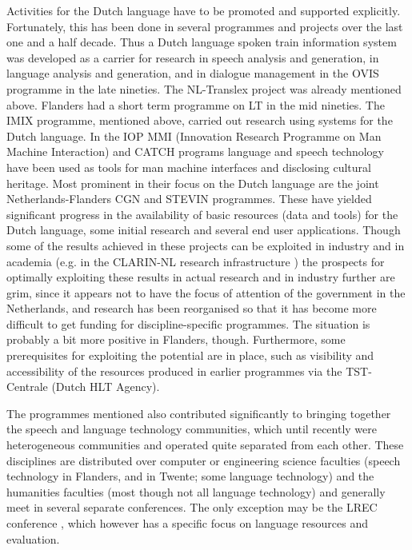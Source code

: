 \documentclass[]{../../metanetpaper}
\begin{document}
\begin{multicols}{2}
  Activities for the Dutch language have to be promoted and supported explicitly. Fortunately, this has been done in several programmes and projects over the last one and a half decade. Thus a Dutch language spoken train information system was developed as a carrier for research in speech analysis and generation, in language analysis and generation, and in dialogue management in the OVIS programme in the late nineties. The NL-Translex project was already mentioned above. Flanders had a short term programme on LT in the mid nineties. The IMIX programme, mentioned above, carried out research using systems for the Dutch language.  In the IOP MMI (Innovation Research Programme on Man Machine Interaction) and CATCH \cite{CATCH} programs language and speech technology have been used as tools for man machine interfaces and disclosing cultural heritage. Most prominent in their focus on the Dutch language are the joint Netherlands-Flanders CGN and STEVIN programmes. These have yielded significant progress in the availability of basic resources (data and tools) for the Dutch language, some initial research and several end user applications. Though some of the results achieved in these projects can be exploited in industry and in academia (e.g. in the CLARIN-NL research infrastructure \cite{CLARIN-NL} ) the prospects for optimally exploiting these results in actual research and in industry further are grim, since it appears not to have the focus of attention of the government in the Netherlands, and research has been reorganised so that it has become more difficult to get funding for discipline-specific programmes. The situation is probably a bit more positive in Flanders, though. Furthermore, some prerequisites for exploiting the potential are in place, such as visibility and accessibility of the resources produced in earlier programmes via the TST-Centrale (Dutch HLT Agency).

  The programmes mentioned also contributed significantly to bringing together the speech and language technology communities, which until recently were heterogeneous communities and operated quite separated from each other. These disciplines are distributed over computer or engineering science faculties (speech technology in Flanders, and in Twente; some language technology) and the humanities faculties (most though not all language technology) and generally meet in several separate conferences. The only exception may be the LREC conference \cite{LREC}, which however has a specific focus on language resources and evaluation.


\end{multicols}
\end{document}
